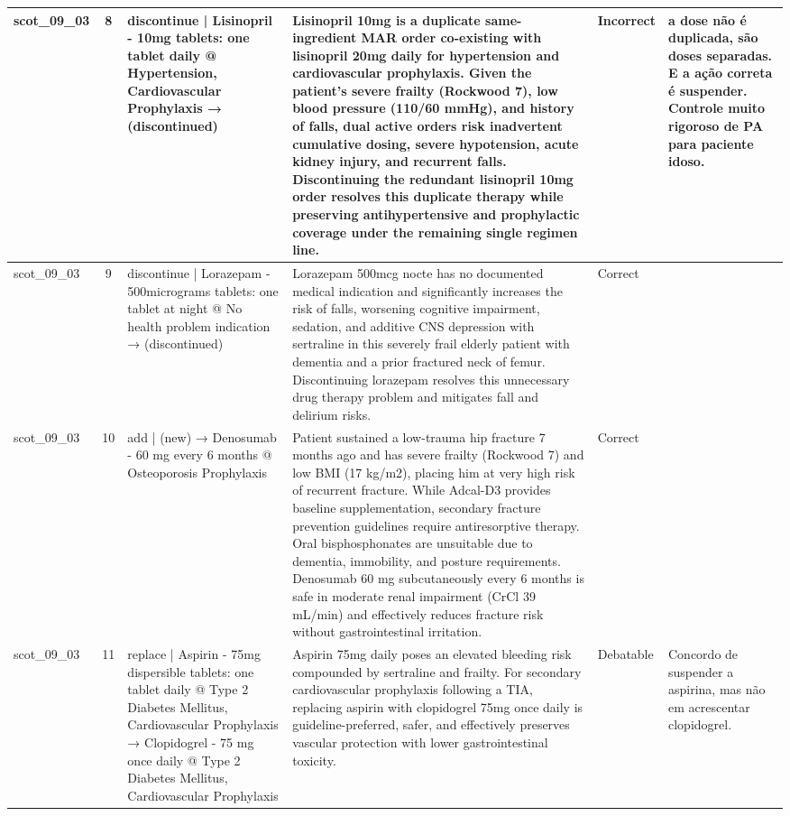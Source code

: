\begin{longtable}{|p{1.45cm}|c|p{3.3cm}|p{6.5cm}|p{1.55cm}|p{2.3cm}|}
\hline
scot\_09\_03 & 8 & discontinue | Lisinopril - 10mg tablets: one tablet daily @ Hypertension, Cardiovascular Prophylaxis → (discontinued) & Lisinopril 10mg is a duplicate same-ingredient MAR order co-existing with lisinopril 20mg daily for hypertension and cardiovascular prophylaxis. Given the patient's severe frailty (Rockwood 7), low blood pressure (110/60 mmHg), and history of falls, dual active orders risk inadvertent cumulative dosing, severe hypotension, acute kidney injury, and recurrent falls. Discontinuing the redundant lisinopril 10mg order resolves this duplicate therapy while preserving antihypertensive and prophylactic coverage under the remaining single regimen line. & Incorrect & a dose não é duplicada, são doses separadas. E a ação correta é suspender. Controle muito rigoroso de PA para paciente idoso. \\
\hline
scot\_09\_03 & 9 & discontinue | Lorazepam - 500micrograms tablets: one tablet at night @ No health problem indication → (discontinued) & Lorazepam 500mcg nocte has no documented medical indication and significantly increases the risk of falls, worsening cognitive impairment, sedation, and additive CNS depression with sertraline in this severely frail elderly patient with dementia and a prior fractured neck of femur. Discontinuing lorazepam resolves this unnecessary drug therapy problem and mitigates fall and delirium risks. & Correct &  \\
\hline
scot\_09\_03 & 10 & add | (new) → Denosumab - 60 mg every 6 months @ Osteoporosis Prophylaxis & Patient sustained a low-trauma hip fracture 7 months ago and has severe frailty (Rockwood 7) and low BMI (17 kg/m2), placing him at very high risk of recurrent fracture. While Adcal-D3 provides baseline supplementation, secondary fracture prevention guidelines require antiresorptive therapy. Oral bisphosphonates are unsuitable due to dementia, immobility, and posture requirements. Denosumab 60 mg subcutaneously every 6 months is safe in moderate renal impairment (CrCl 39 mL/min) and effectively reduces fracture risk without gastrointestinal irritation. & Correct &  \\
\hline
scot\_09\_03 & 11 & replace | Aspirin - 75mg dispersible tablets: one tablet daily @ Type 2 Diabetes Mellitus, Cardiovascular Prophylaxis → Clopidogrel - 75 mg once daily @ Type 2 Diabetes Mellitus, Cardiovascular Prophylaxis & Aspirin 75mg daily poses an elevated bleeding risk compounded by sertraline and frailty. For secondary cardiovascular prophylaxis following a TIA, replacing aspirin with clopidogrel 75mg once daily is guideline-preferred, safer, and effectively preserves vascular protection with lower gastrointestinal toxicity. & Debatable & Concordo de suspender a aspirina, mas não em acrescentar clopidogrel. \\

\end{longtable}
